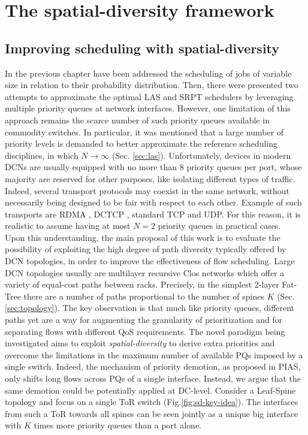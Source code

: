 \chapter{The spatial-diversity framework}
\label{ch:sdframework}
\section{Improving scheduling with spatial-diversity}

In the previous chapter have been addressed the scheduling of jobs of variable size in relation to their probability distribution. Then, there were presented two attempts to approximate the optimal LAS and SRPT schedulers by leveraging multiple priority queues at network interfaces. However, one limitation of this approach remains the scarce number of such priority queues available in commodity switches. In particular, it was mentioned that a large number of priority levels is demanded to better approximate the reference scheduling disciplines, in which $N \rightarrow \infty$ (Sec. \ref{sec:las}). Unfortunately, devices in modern DCNs are usually equipped with no more than 8 priority queues per port, whose majority are reserved for other purposes, like isolating different types of traffic. Indeed, several transport protocols may coexist in the same network, without necessarily being designed to be fair with respect to each other. Example of such transports are RDMA \cite{rdma}, DCTCP \cite{dctcp}, standard TCP and UDP. For this reason, it is realistic to assume having at most $N=2$ priority queues in practical cases. \\
Upon this understanding, the main proposal of this work is to evaluate the possibility of exploiting the high degree of path diversity typically offered by DCN topologies, in order to improve the effectiveness of flow scheduling. Large DCN topologies usually are multilayer recursive Clos networks which offer a variety of equal-cost paths between racks. Precisely, in the simplest 2-layer Fat-Tree there are a number of paths proportional to the number of spines $K$ (Sec. \ref{sec:topology}). The key observation is that much like priority queues, different paths yet are a way for augmenting the granularity of prioritization and for separating flows with different QoS requirements. The novel paradigm being investigated aims to exploit \emph{spatial-diversity} to derive extra priorities and overcome the limitations in the maximum number of available PQs imposed by a single switch. Indeed, the mechanism of priority demotion, as proposed in PIAS, only shifts long flows across PQs of a single interface. Instead, we argue that the same demotion could be potentially applied at DC-level. Consider a Leaf-Spine topology and focus on a single ToR switch (Fig.\ref{fig:sd-key-idea}). The interfaces from such a ToR towards all spines can be seen jointly as a unique big interface with $K$ times more priority queues than a port alone.
